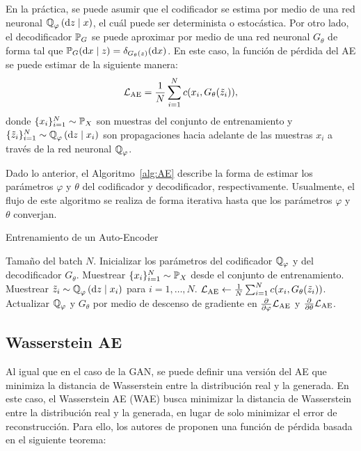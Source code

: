 En la práctica, se puede asumir que el codificador se estima por medio de una red neuronal $\ProbQ_\varphi \left( \dd z \mid x \right)$, el cuál puede ser determinista o estocástica. Por otro lado, el decodificador $\Prob_G$ se puede aproximar por medio de una red neuronal $G_\theta$ de forma tal que $\Prob_G(\dd x \mid z) = \delta_{G_\theta(z)}(\dd x)$.
En este caso, la función de pérdida del AE se puede estimar de la siguiente manera:
\begin{equation}
    \mathcal{L}_{\mathrm{AE}} = \frac{1}{N}\sum_{i=1}^{N} c(x_i, G_\theta(\tilde z_i)),
\end{equation}
donde $\{x_i\}_{i=1}^{N} \sim \Prob_X$ son muestras del conjunto de entrenamiento y $\{\tilde z_i\}_{i=1}^{N} \sim \ProbQ_\varphi \left( \dd z \mid x_i \right)$ son propagaciones hacia adelante de las muestras $x_i$ a través de la red neuronal $\ProbQ_\varphi$.

Dado lo anterior, el Algoritmo~\ref{alg:AE} describe la forma de estimar los parámetros $\varphi$ y $\theta$ del codificador y decodificador, respectivamente. Usualmente, el flujo de este algoritmo se realiza de forma iterativa hasta que los parámetros $\varphi$ y $\theta$ converjan.

\begin{algorithm}[H]
    \caption{Entrenamiento de un Auto-Encoder}\label{alg:AE}
    \begin{algorithmic}[1]
        \Require Tamaño del batch $N$.
        \State Inicializar los parámetros del codificador $\ProbQ_\varphi$ y del decodificador $G_\theta$.
        \State Muestrear $\{x_i\}_{i=1}^{N} \sim \Prob_X$ desde el conjunto de entrenamiento.
        \State Muestrear $\tilde z_i \sim \ProbQ_\varphi \left( \dd z \mid x_i \right)$ para $i=1,\ldots,N$.
        \State $\mathcal{L}_{\mathrm{AE}}\gets \frac{1}{N}\sum_{i=1}^{N} c(x_i, G_\theta(\tilde z_i))$.
        \State Actualizar $\ProbQ_\varphi$ y $G_\theta$ por medio de descenso de gradiente en $\pdv{\varphi} \cL_{\mathrm{AE}}$ y $\pdv{\theta} \mathcal{L}_{\mathrm{AE}}$.
        \EndWhile
    \end{algorithmic}

\end{algorithm}


\subsection{Wasserstein AE}\label{ssec:WAE}  %

Al igual que en el caso de la GAN, se puede definir una versión del AE que minimiza la distancia de Wasserstein entre la distribución real y la generada. En este caso, el Wasserstein AE (WAE) \cite{tolstikhin2017wasserstein} busca minimizar la distancia de Wasserstein entre la distribución real y la generada, en lugar de solo minimizar el error de reconstrucción. Para ello, los autores de \cite{tolstikhin2017wasserstein} proponen una función de pérdida basada en el siguiente teorema:


